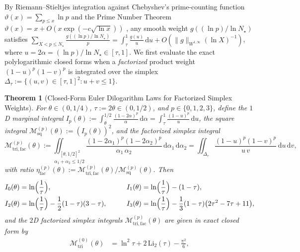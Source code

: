 \documentclass[11pt,reqno]{amsart}
\newtheorem{theorem}{Theorem}[section]
\theoremstyle{definition}
\theoremstyle{remark}
\numberwithin{equation}{section}
\newcommand{\dd}{\mathrm{d}}
\newcommand{\Li}{\mathrm{Li}}
\newcommand{\tri}{\mathrm{tri}}
\newcommand{\sq}{\mathrm{sq}}
\newcommand{\facw}{\mathrm{fac}}
\begin{document}
By Riemann--Stieltjes integration against Chebyshev's prime-counting function $\vartheta(x) = \sum_{p\le x}\ln p$ and the Prime Number Theorem $\vartheta(x) = x + O(x\exp(-c\sqrt{\ln x}))$ \cite{MontgomeryVaughan2007}, any smooth weight $g((\ln p)/\ln N_\star)$ satisfies $\sum_{X < p \le N_\star} \frac{g((\ln p)/\ln N_\star)}{p} = \int_\tau^1 \frac{g(u)}{u}\,\dd u + O(\|g\|_{W^{1,\infty}}(\ln X)^{-1})$, where $u = 2\alpha = (\ln p)/\ln N_\star \in [\tau,1]$. We first evaluate the exact polylogarithmic closed forms when a \emph{factorized} product weight $(1-u)^p(1-v)^p$ is integrated over the simplex $\Delta_\tau := \{(u,v) \in [\tau,1]^2 : u + v \le 1\}$.

\begin{theorem}[Closed-Form Euler Dilogarithm Laws for Factorized Simplex Weights]\label{thm:dilogarithm-laws}
For $\theta \in (0,1/4)$, $\tau := 2\theta \in (0,1/2)$, and $p \in \{0,1,2,3\}$, define the $1$D marginal integral $I_p(\theta) := \int_\theta^{1/2}\frac{(1-2\alpha)^p}{\alpha}\,\dd\alpha = \int_\tau^1 \frac{(1-u)^p}{u}\,\dd u$, the square integral $\mathcal{M}_{\sq}^{(p)}(\theta) := (I_p(\theta))^2$, and the factorized simplex integral
\begin{equation}\label{eq:M-tri-integral}
\mathcal{M}_{\tri,\facw}^{(p)}(\theta) := \underset{\alpha_1 + \alpha_2 \le 1/2}{\iint_{[\theta,1/2]^2}} \frac{(1-2\alpha_1)^p(1-2\alpha_2)^p}{\alpha_1\,\alpha_2}\,\dd\alpha_1\,\dd\alpha_2 = \iint_{\Delta_\tau} \frac{(1-u)^p(1-v)^p}{u\,v}\,\dd u\,\dd v,
\end{equation}
with ratio $\eta_{\facw}^{(p)}(\theta) := \mathcal{M}_{\tri,\facw}^{(p)}(\theta)/\mathcal{M}_{\sq}^{(p)}(\theta)$. Then
\begin{equation}\label{eq:Ip-closed}
\begin{aligned}
I_0(\theta) &= \ln\Bigl(\frac{1}{\tau}\Bigr), &\qquad I_1(\theta) &= \ln\Bigl(\frac{1}{\tau}\Bigr) - (1-\tau), \\
I_2(\theta) &= \ln\Bigl(\frac{1}{\tau}\Bigr) - \frac{1}{2}(1-\tau)(3-\tau), &\qquad I_3(\theta) &= \ln\Bigl(\frac{1}{\tau}\Bigr) - \frac{1}{3}(1-\tau)\bigl(2\tau^2 - 7\tau + 11\bigr),
\end{aligned}
\end{equation}
and the $2$D factorized simplex integrals $\mathcal{M}_{\tri,\facw}^{(p)}(\theta)$ are given in exact closed form by
\begin{align}
\mathcal{M}_{\tri}^{(0)}(\theta) &= \ln^2\tau + 2\,\Li_2(\tau) - \frac{\pi^2}{6}, \label{eq:M-tri-0} \\

\end{align}
\end{theorem}
\end{document}
